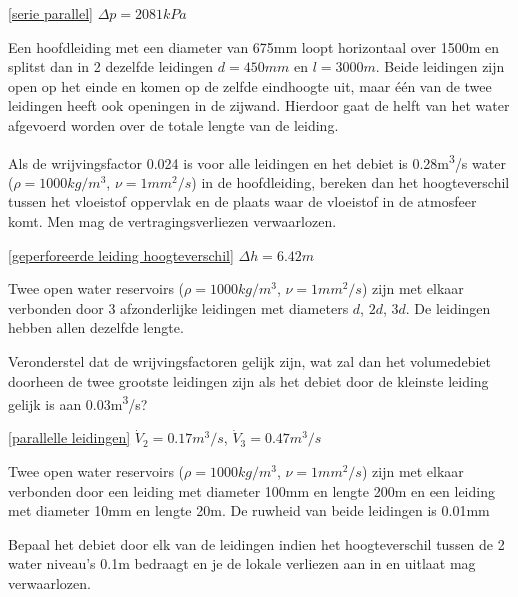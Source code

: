 \begin{antwoord}{\ref{serie parallel}}
	$\Delta p = 2081\unit{kPa}$
\end{antwoord}
\begin{toepassing}
	\label{geperforeerde leiding hoogteverschil}
Een hoofdleiding met een diameter van 675mm loopt horizontaal over 1500m en splitst dan in 2 dezelfde leidingen $d=450\unit{mm}$ en $l=3000\unit{m}$. Beide leidingen zijn open op het einde en komen op de zelfde eindhoogte uit, maar één van de twee leidingen heeft ook openingen in de zijwand. Hierdoor gaat de helft van het water afgevoerd worden over de totale lengte van de leiding.

Als de wrijvingsfactor 0.024 is voor alle leidingen en het debiet is 0.28\unit{m^3/s} water ($\rho=1000\unit{kg/m^3}$, $\nu=1\unit{mm^2/s}$) in de hoofdleiding, bereken dan het hoogteverschil tussen het vloeistof oppervlak en de plaats waar de vloeistof in de atmosfeer komt. Men mag de vertragingsverliezen verwaarlozen.
\end{toepassing}
\begin{antwoord}{\ref{geperforeerde leiding hoogteverschil}}
	$\Delta h = 6.42\unit{m}$
\end{antwoord}
\begin{toepassing}
	\label{parallelle leidingen}
Twee open water reservoirs ($\rho=1000\unit{kg/m^3}$, $\nu=1\unit{mm^2/s}$) zijn met elkaar verbonden door 3 afzonderlijke leidingen met diameters $d$, $2d$, $3d$. De leidingen hebben allen dezelfde lengte.
		
Veronderstel dat de wrijvingsfactoren gelijk zijn, wat zal dan het volumedebiet doorheen de twee grootste leidingen zijn als het debiet door de kleinste leiding gelijk is aan 0.03\unit{m^3/s}? 
\end{toepassing}
\begin{antwoord}{\ref{parallelle leidingen}}
	$\dot{V}_2 = 0.17\unit{m^3/s}$, $\dot{V}_3 = 0.47\unit{m^3/s}$
\end{antwoord}
\begin{toepassing}[*]
	\label{turbulent laminair}
	Twee open water reservoirs ($\rho=1000\unit{kg/m^3}$, $\nu=1\unit{mm^2/s}$) zijn met elkaar verbonden door een leiding met diameter 100mm en lengte 200m en een leiding met diameter 10mm en lengte 20m. De ruwheid van beide leidingen is 0.01mm
	
Bepaal het debiet door elk van de leidingen indien het hoogteverschil tussen de 2 water niveau's 0.1m bedraagt en je de lokale verliezen aan in en uitlaat mag verwaarlozen.
\end{toepassing}
